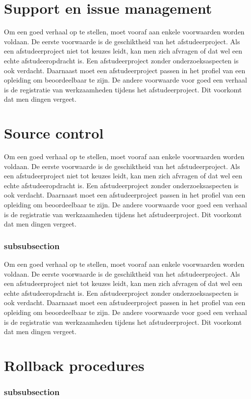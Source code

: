 		\section{Support en issue management}
		Om een goed verhaal op te stellen, moet vooraf aan enkele voorwaarden
		worden voldaan. De eerste voorwaarde is de geschiktheid van het
		afstudeerproject. Als een afstudeerproject niet tot keuzes leidt, kan
		men zich afvragen of dat wel een echte afstudeeropdracht is. Een
		afstudeerproject zonder onderzoeksaspecten is ook verdacht. Daarnaast
		moet een afstudeerproject passen in het profiel van een opleiding om
		beoordeelbaar te zijn. De andere voorwaarde voor goed een verhaal is
		de registratie van werkzaamheden tijdens het afstudeerproject. Dit
		voorkomt dat men dingen vergeet.
		\section{Source control}
		Om een goed verhaal op te stellen, moet vooraf aan enkele voorwaarden
		worden voldaan. De eerste voorwaarde is de geschiktheid van het
		afstudeerproject. Als een afstudeerproject niet tot keuzes leidt, kan
		men zich afvragen of dat wel een echte afstudeeropdracht is. Een
		afstudeerproject zonder onderzoeksaspecten is ook verdacht. Daarnaast
		moet een afstudeerproject passen in het profiel van een opleiding om
		beoordeelbaar te zijn. De andere voorwaarde voor goed een verhaal is
		de registratie van werkzaamheden tijdens het afstudeerproject. Dit
		voorkomt dat men dingen vergeet.
		\subsubsection{subsubsection}
		
		Om een goed verhaal op te stellen, moet vooraf aan enkele voorwaarden
		worden voldaan. De eerste voorwaarde is de geschiktheid van het
		afstudeerproject. Als een afstudeerproject niet tot keuzes leidt, kan
		men zich afvragen of dat wel een echte afstudeeropdracht is. Een
		afstudeerproject zonder onderzoeksaspecten is ook verdacht. Daarnaast
		moet een afstudeerproject passen in het profiel van een opleiding om
		beoordeelbaar te zijn. De andere voorwaarde voor goed een verhaal is
		de registratie van werkzaamheden tijdens het afstudeerproject. Dit
		voorkomt dat men dingen vergeet.
		\section{Rollback procedures}
		\subsubsection{subsubsection}
		
